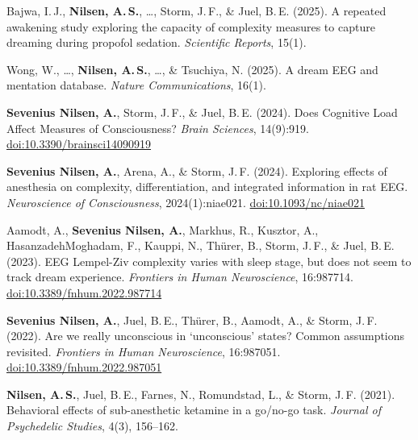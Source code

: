 \documentclass[11pt, a4paper]{article}
\begin{document}
\begin{enumerate}[leftmargin=2em, label={[\arabic*]}, itemsep=0.4em]

  \item Bajwa, I.\,J., \textbf{Nilsen, A.\,S.}, \ldots, Storm, J.\,F., \& Juel, B.\,E. (2025).
        A repeated awakening study exploring the capacity of complexity measures to capture
        dreaming during propofol sedation.
        \textit{Scientific Reports}, 15(1).

  \item Wong, W., \ldots, \textbf{Nilsen, A.\,S.}, \ldots, \& Tsuchiya, N. (2025).
        A dream EEG and mentation database.
        \textit{Nature Communications}, 16(1).

  \item \textbf{Sevenius Nilsen, A.}, Storm, J.\,F., \& Juel, B.\,E. (2024).
        Does Cognitive Load Affect Measures of Consciousness?
        \textit{Brain Sciences}, 14(9):919.
        \href{https://doi.org/10.3390/brainsci14090919}{doi:10.3390/brainsci14090919}

  \item \textbf{Sevenius Nilsen, A.}, Arena, A., \& Storm, J.\,F. (2024).
        Exploring effects of anesthesia on complexity, differentiation, and integrated
        information in rat EEG.
        \textit{Neuroscience of Consciousness}, 2024(1):niae021.
        \href{https://doi.org/10.1093/nc/niae021}{doi:10.1093/nc/niae021}

  \item Aamodt, A., \textbf{Sevenius Nilsen, A.}, Markhus, R., Kusztor, A.,
        HasanzadehMoghadam, F., Kauppi, N., Th\"urer, B., Storm, J.\,F., \& Juel, B.\,E. (2023).
        EEG Lempel-Ziv complexity varies with sleep stage, but does not seem to track
        dream experience.
        \textit{Frontiers in Human Neuroscience}, 16:987714.
        \href{https://doi.org/10.3389/fnhum.2022.987714}{doi:10.3389/fnhum.2022.987714}

  \item \textbf{Sevenius Nilsen, A.}, Juel, B.\,E., Th\"urer, B., Aamodt, A., \& Storm, J.\,F. (2022).
        Are we really unconscious in `unconscious' states? Common assumptions revisited.
        \textit{Frontiers in Human Neuroscience}, 16:987051.
        \href{https://doi.org/10.3389/fnhum.2022.987051}{doi:10.3389/fnhum.2022.987051}

  \item \textbf{Nilsen, A.\,S.}, Juel, B.\,E., Farnes, N., Romundstad, L., \& Storm, J.\,F. (2021).
        Behavioral effects of sub-anesthetic ketamine in a go/no-go task.
        \textit{Journal of Psychedelic Studies}, 4(3), 156--162.


\end{enumerate}
\end{document}
